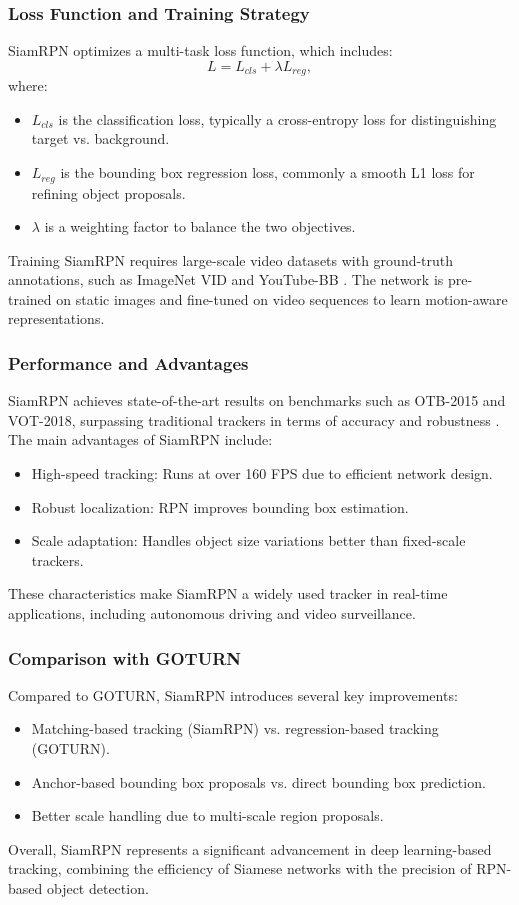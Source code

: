 \subsubsection{Loss Function and Training Strategy}
SiamRPN optimizes a multi-task loss function, which includes:
\begin{equation}
L = L_{cls} + \lambda L_{reg},
\end{equation}
where:
\begin{itemize}
\item $L_{cls}$ is the classification loss, typically a cross-entropy loss for distinguishing target vs. background.
\item $L_{reg}$ is the bounding box regression loss, commonly a smooth L1 loss for refining object proposals.
\item $\lambda$ is a weighting factor to balance the two objectives.
\end{itemize}
Training SiamRPN requires large-scale video datasets with ground-truth annotations, such as ImageNet VID and YouTube-BB \cite{li2018high}. The network is pre-trained on static images and fine-tuned on video sequences to learn motion-aware representations.

\subsubsection{Performance and Advantages}
SiamRPN achieves state-of-the-art results on benchmarks such as OTB-2015 and VOT-2018, surpassing traditional trackers in terms of accuracy and robustness \cite{li2018high}. The main advantages of SiamRPN include:
\begin{itemize}
\item High-speed tracking: Runs at over 160 FPS due to efficient network design.
\item Robust localization: RPN improves bounding box estimation.
\item Scale adaptation: Handles object size variations better than fixed-scale trackers.
\end{itemize}
These characteristics make SiamRPN a widely used tracker in real-time applications, including autonomous driving and video surveillance.

\subsubsection{Comparison with GOTURN}
Compared to GOTURN, SiamRPN introduces several key improvements:
\begin{itemize}
\item Matching-based tracking (SiamRPN) vs. regression-based tracking (GOTURN).
\item Anchor-based bounding box proposals vs. direct bounding box prediction.
\item Better scale handling due to multi-scale region proposals.
\end{itemize}
Overall, SiamRPN represents a significant advancement in deep learning-based tracking, combining the efficiency of Siamese networks with the precision of RPN-based object detection.

